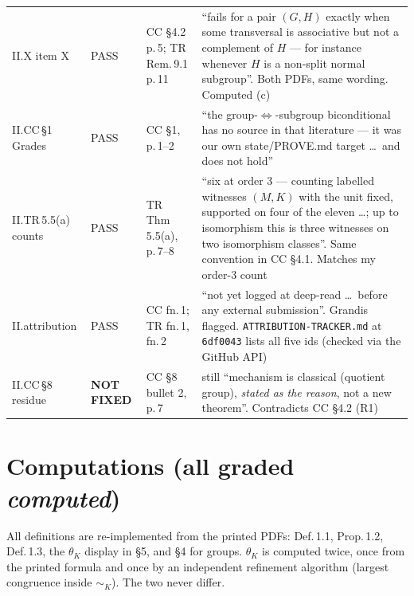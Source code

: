 \documentclass[11pt]{article}
\begin{document}
{\begin{tabularx}{\linewidth}{@{}>{\raggedright\arraybackslash}p{2.3cm}>{\raggedright\arraybackslash}p{1.75cm}>{\raggedright\arraybackslash}p{2.45cm}>{\raggedright\arraybackslash}X@{}}
\midrule
II.X item X & PASS & CC \S4.2 p.\,5; TR Rem.\,9.1 p.\,11 & ``fails for a pair $(G,H)$ exactly when some transversal is associative but not a complement of $H$ --- for instance whenever $H$ is a non-split normal subgroup''. Both PDFs, same wording. Computed (c)\\
II.CC\,\S1 Grades & PASS & CC \S1, p.\,1--2 & ``the group-$\iff$-subgroup biconditional has no source in that literature --- it was our own state/PROVE.md target \dots\ and does not hold''\\
II.TR\,5.5(a) counts & PASS & TR Thm\,5.5(a), p.\,7--8 & ``six at order 3 --- counting labelled witnesses $(M,K)$ with the unit fixed, supported on four of the eleven \dots; up to isomorphism this is three witnesses on two isomorphism classes''. Same convention in CC \S4.1. Matches my order-3 count\\
II.attribution & PASS & CC fn.\,1; TR fn.\,1, fn.\,2 & ``not yet logged at deep-read \dots\ before any external submission''. Grandis flagged. \texttt{ATTRIBUTION-TRACKER.md} at \texttt{6df0043} lists all five ids (checked via the GitHub API)\\
II.CC\,\S8 residue & \textbf{NOT FIXED} & CC \S8 bullet 2, p.\,7 & still ``mechanism is classical (quotient group), \emph{stated as the reason}, not a new theorem''. Contradicts CC \S4.2 (R1)\\
\bottomrule
\end{tabularx}}

\section*{Computations (all graded \emph{computed})}
All definitions are re-implemented from the printed PDFs: Def.\,1.1, Prop.\,1.2, Def.\,1.3, the $\theta_K$ display in \S5, and \S4 for groups.
$\theta_K$ is computed twice, once from the printed formula and once by an independent refinement algorithm (largest congruence inside ${\sim_K}$). The two never differ.
\end{document}
